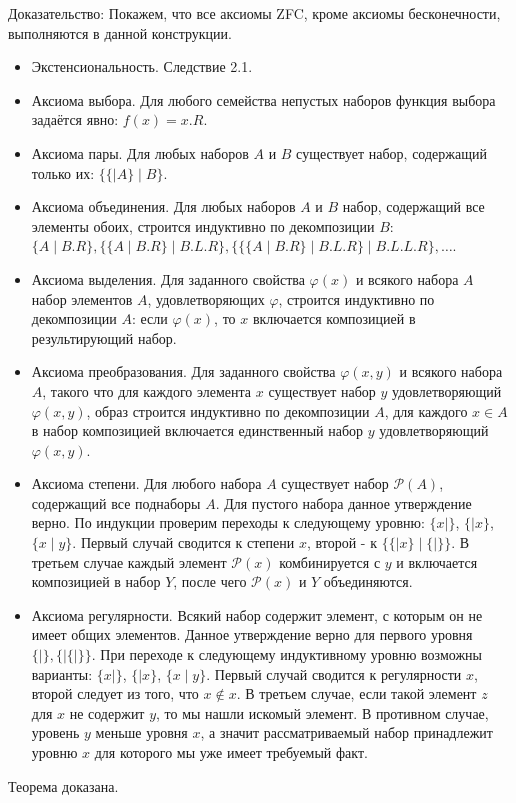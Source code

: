 \documentclass[12pt]{article}
\begin{document}
Доказательство:
Покажем, что все аксиомы ZFC, кроме аксиомы бесконечности, выполняются в данной конструкции.
\begin{itemize}
	\item Экстенсиональность. Следствие 2.1.
	\item Аксиома выбора. Для любого семейства непустых наборов функция выбора задаётся явно: $f(x) = x.R$.
	\item Аксиома пары. Для любых наборов $A$ и $B$ существует набор, содержащий только их: $\{ \{ \mid A \} \mid B \}$.
	\item Аксиома объединения. Для любых наборов $A$ и $B$ набор, содержащий все элементы обоих, строится индуктивно по декомпозиции $B$: $\{ A \mid B.R \}, \{ \{ A \mid B.R \} \mid B.L.R \}, \{ \{ \{ A \mid B.R \} \mid B.L.R \} \mid B.L.L.R \}, \dots$.
	\item Аксиома выделения. Для заданного свойства $\varphi(x)$ и всякого набора $A$ набор элементов $A$, удовлетворяющих $\varphi$, строится индуктивно по декомпозиции $A$: если $\varphi(x)$, то $x$ включается композицией в результирующий набор.
	\item Аксиома преобразования. Для заданного свойства $\varphi(x, y)$ и всякого набора $A$, такого что для каждого элемента $x$ существует набор $y$ удовлетворяющий $\varphi(x, y)$, образ строится индуктивно по декомпозиции $A$, для каждого $x \in A$ в набор композицией включается единственный набор $y$ удовлетворяющий $\varphi(x, y)$.
	\item Аксиома степени. Для любого набора $A$ существует набор $\mathcal{P}(A)$, содержащий все поднаборы $A$. Для пустого набора данное утверждение верно. По индукции проверим переходы к следующему уровню: $\{ x \mid \}$, $\{ \mid x \}$, $\{ x \mid y \}$. Первый случай сводится к степени $x$, второй - к $\{ \{ \mid x \} \mid \{ \mid \}\}$. В третьем случае каждый элемент $\mathcal{P}(x)$ комбинируется с $y$ и включается композицией в набор $Y$, после чего $\mathcal{P}(x)$ и $Y$ объединяются.
	\item Аксиома регулярности. Всякий набор содержит элемент, с которым он не имеет общих элементов. Данное утверждение верно для первого уровня $\{ \mid \}, \{ \mid \{ \mid \} \}$. При переходе к следующему индуктивному уровню возможны варианты: $\{ x \mid \}$, $\{ \mid x \}$, $\{ x \mid y \}$. Первый случай сводится к регулярности $x$, второй следует из того, что $x \notin x$. В третьем случае, если такой элемент $z$ для $x$ не содержит $y$, то мы нашли искомый элемент. В противном случае, уровень $y$ меньше уровня $x$, а значит рассматриваемый набор принадлежит уровню $x$ для которого мы уже имеет требуемый факт. 
\end{itemize}
Теорема доказана.
\end{document}
